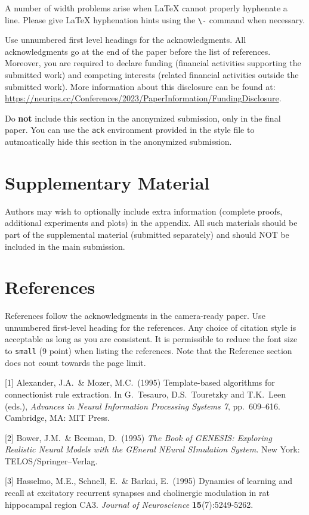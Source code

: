 \documentclass{article}
\begin{document}
A number of width problems arise when \LaTeX{} cannot properly hyphenate a
line. Please give LaTeX hyphenation hints using the \verb+\-+ command when
necessary.


\begin{ack}
    Use unnumbered first level headings for the acknowledgments. All acknowledgments
    go at the end of the paper before the list of references. Moreover, you are required to declare
    funding (financial activities supporting the submitted work) and competing interests (related financial activities outside the submitted work).
    More information about this disclosure can be found at: \url{https://neurips.cc/Conferences/2023/PaperInformation/FundingDisclosure}.


    Do {\bf not} include this section in the anonymized submission, only in the final paper. You can use the \texttt{ack} environment provided in the style file to autmoatically hide this section in the anonymized submission.
\end{ack}



\section{Supplementary Material}

Authors may wish to optionally include extra information (complete proofs, additional experiments and plots) in the appendix. All such materials should be part of the supplemental material (submitted separately) and should NOT be included in the main submission.


\section*{References}


References follow the acknowledgments in the camera-ready paper. Use unnumbered first-level heading for
the references. Any choice of citation style is acceptable as long as you are
consistent. It is permissible to reduce the font size to \verb+small+ (9 point)
when listing the references.
Note that the Reference section does not count towards the page limit.
\medskip


{
\small


[1] Alexander, J.A.\ \& Mozer, M.C.\ (1995) Template-based algorithms for
connectionist rule extraction. In G.\ Tesauro, D.S.\ Touretzky and T.K.\ Leen
(eds.), {\it Advances in Neural Information Processing Systems 7},
pp.\ 609--616. Cambridge, MA: MIT Press.


    [2] Bower, J.M.\ \& Beeman, D.\ (1995) {\it The Book of GENESIS: Exploring
        Realistic Neural Models with the GEneral NEural SImulation System.}  New York:
TELOS/Springer--Verlag.


[3] Hasselmo, M.E., Schnell, E.\ \& Barkai, E.\ (1995) Dynamics of learning and
recall at excitatory recurrent synapses and cholinergic modulation in rat
hippocampal region CA3. {\it Journal of Neuroscience} {\bf 15}(7):5249-5262.
}

\end{document}
